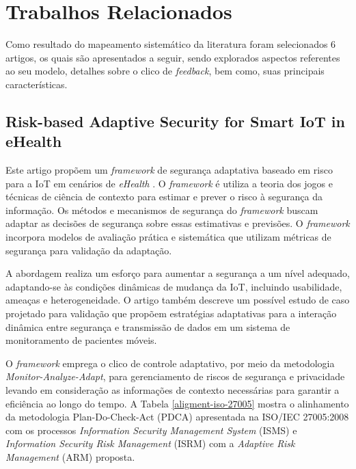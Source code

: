\documentclass[tid,table]{texufpel} %
\begin{document}
\section{Trabalhos Relacionados}

Como resultado do mapeamento sistemático da literatura foram selecionados 6 artigos, os quais são apresentados a seguir, sendo explorados aspectos referentes ao seu modelo, detalhes sobre o clico de \textit{feedback}, bem como, suas principais características. 


\subsection{Risk-based Adaptive Security for Smart IoT in eHealth} %

Este artigo propõem um \textit{framework} de segurança adaptativa baseado em risco para a IoT em cenários de \textit{eHealth} \cite{habtamu12}. O \textit{framework} é utiliza a teoria dos jogos e técnicas de ciência de contexto para estimar e prever o risco à segurança da informação. Os métodos e mecanismos de segurança do \textit{framework} buscam adaptar as decisões de segurança sobre essas estimativas e previsões. O \textit{framework} incorpora modelos de avaliação prática e sistemática que utilizam métricas de segurança para validação da adaptação.

A abordagem realiza um esforço para aumentar a segurança a um nível adequado, adaptando-se às condições dinâmicas de mudança da IoT, incluindo usabilidade, ameaças e heterogeneidade. O artigo também descreve um possível estudo de caso projetado para validação que propõem estratégias adaptativas para a interação dinâmica entre segurança e transmissão de dados em um sistema de monitoramento de pacientes móveis.

O \textit{framework} emprega o clico de controle adaptativo, por meio da metodologia \textit{Monitor-Analyze-Adapt}, para gerenciamento de riscos de segurança e privacidade levando em consideração as informações de contexto necessárias para garantir a eficiência ao longo do tempo. A Tabela \ref{aligment-iso-27005} mostra o alinhamento da metodologia Plan-Do-Check-Act (PDCA) apresentada na ISO/IEC 27005:2008 com os processos \textit{Information Security Management System} (ISMS) e \textit{Information Security Risk Management} (ISRM) com a \textit{Adaptive Risk Management} (ARM) proposta.
\end{document}
